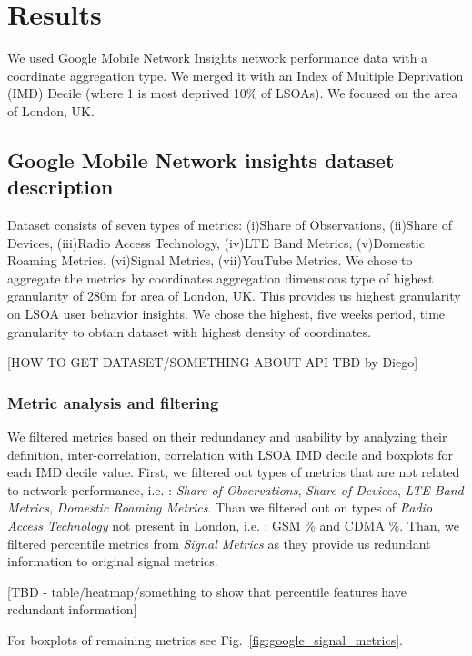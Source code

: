 \section{Results}

We used Google Mobile Network Insights network performance data with a coordinate aggregation type. We merged it with an Index of Multiple Deprivation (IMD) Decile (where 1 is most deprived 10\% of LSOAs). We focused on the area of London, UK.

\subsection{Google Mobile Network insights dataset description}

Dataset consists of seven types of metrics: (i)Share of Observations, (ii)Share of Devices, (iii)Radio Access Technology, (iv)LTE Band Metrics, (v)Domestic Roaming Metrics, (vi)Signal Metrics, (vii)YouTube Metrics.
We chose to aggregate the metrics by coordinates aggregation dimensions type of highest granularity of 280m for area of London, UK. This provides us highest granularity on LSOA user behavior insights. We chose the highest, five weeks period, time granularity to obtain dataset with highest density of coordinates.

[HOW TO GET DATASET/SOMETHING ABOUT API TBD by Diego]

\subsubsection{Metric analysis and filtering}

We filtered metrics based on their redundancy and usability by analyzing their definition, inter-correlation, correlation with LSOA IMD decile and boxplots for each IMD decile value. First, we filtered out types of metrics that are not related to network performance, i.e. : \textit{Share of Observations}, \textit{Share of Devices}, \textit{LTE Band Metrics}, \textit{Domestic Roaming Metrics}. Than we filtered out on types of \textit{Radio Access Technology} not present in London, i.e. : GSM \% and CDMA \%. Than, we filtered percentile metrics from \textit{Signal Metrics} as they provide us redundant information to original signal metrics. 

[TBD - table/heatmap/something to show that percentile features have redundant information]

For boxplots of remaining metrics see Fig.~\ref{fig:google_signal_metrics}.

